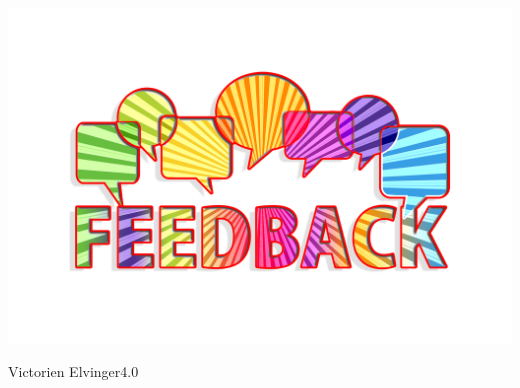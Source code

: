 \documentclass[xcolor=table,t]{beamer}
\begin{document}
\begin{frame}[plain]
    \begin{minipage}[c][.9\textheight][t]{\textwidth}
        \centering
        \vspace{0.2\textheight}
        \includegraphics[height=.5\textheight]{fig/feedback.png}%
    \end{minipage}
    \begin{minipage}{\textwidth}
        \centering
        Victorien Elvinger\hspace{.5em}\ccby\hspace{3pt}4.0
    \end{minipage}
\end{frame}
\end{document}
